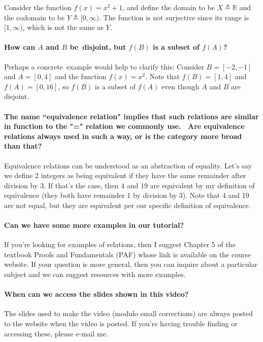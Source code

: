 \documentclass[10pt,english]{article}
\begin{document}
Consider the function $f(x) = x^2 + 1$, and define the domain to be $X \triangleq \mathbb{R}$ and the codomain to be $Y \triangleq [0,\infty)$. The function is not surjective since its range is $[1,\infty)$, which is not the same as $Y$.

\paragraph{How can $A$ and $B$ be disjoint, but $f(B)$ is a subset of $f(A)$?}

Perhaps a concrete example would help to clarify this: Consider $B= [-2,-1]$ and $A = [0,4]$ and the function $f(x) = x^2$.
Note that $f(B) = [1,4]$ and $f(A) = [0,16]$, so $f(B)$ is a subset of $f(A)$ even though $A$ and $B$ are disjoint.


\paragraph{The name ``equivalence relation" implies that such relations are similar in function to the "=" relation we commonly use.  Are equivalence relations always used in such a way, or is the category more broad than that?}

Equivalence relations can be understood as an abstraction of equality. Let's say we define 2 integers as being equivalent if they have the same remainder after division by 3. If that's the case, then 4 and 19 are equivalent by my definition of equivalence (they both have remainder 1 by division by 3). Note that 4 and 19 are not equal, but they are equivalent per our specific definition of equivalence.

\paragraph{Can we have some more examples in our tutorial? }

If you're looking for examples of relations, then I suggest Chapter 5 of the textbook Proofs and Fundamentals (PAF) whose link is available on the course website.  If your question is more general, then you can inquire about a particular subject and we can suggest resources with more examples.

\paragraph{When can we access the slides shown in this video?}

The slides used to make the video (modulo small corrections) are always posted to the website when the video is posted.  If you're having trouble finding or accessing these, please e-mail me.

    
    
\end{document}
